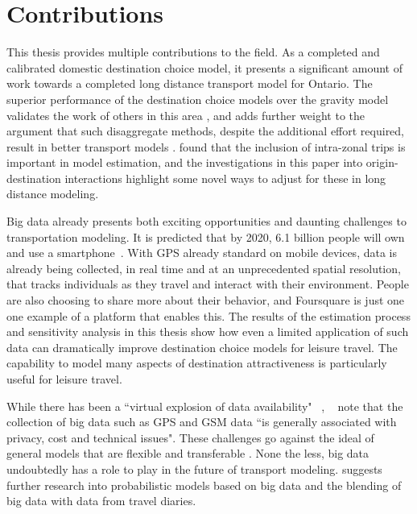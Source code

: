 \section{Contributions}
This thesis provides multiple contributions to the field. As a completed and calibrated domestic destination choice model, it presents a significant amount of work towards a completed long distance transport model for Ontario. The superior performance of the destination choice models over the gravity model validates the work of others in this area \parencite{Mishra13}, 
and adds further weight to the argument that such disaggregate methods, despite the additional effort required, result in better transport models \parencite{sbayti2010best, lemp2007aggregate}. \textcite{bhatta2011intrazonal} found that the inclusion of intra-zonal trips is important in model estimation, and the investigations in this paper into origin-destination interactions highlight some novel ways to adjust for these in long distance modeling.

Big data already presents both exciting opportunities and daunting challenges to transportation modeling. It is predicted that by 2020, 6.1 billion people will own and use a smartphone~\parencite{ericsson16}. With GPS already standard on mobile devices, data is already being collected, in real time and at an unprecedented spatial resolution, that tracks individuals as they travel and interact with their environment. People are also choosing to share more about their behavior, and Foursquare is just one one example of a platform that enables this. The results of the estimation process and sensitivity analysis in this thesis show how even a limited application of such data can dramatically improve destination choice models for leisure travel. The capability to model many aspects of destination attractiveness is particularly useful for leisure travel.

While there has been a ``virtual explosion of data availability" ~\textcite{nagel2001workshop},  ~\parencite{horni2012improve} note that  the collection of big data such as GPS and GSM data ``is generally associated with privacy, cost and technical issues".  These challenges go against the ideal of general models that are flexible and transferable \parencite{patriksson2015traffic}. None the less, big data undoubtedly has a role to play in the future of transport modeling. \textcite{rth2015} suggests further research into probabilistic models based on big data and the blending of big data with data from travel diaries. 

